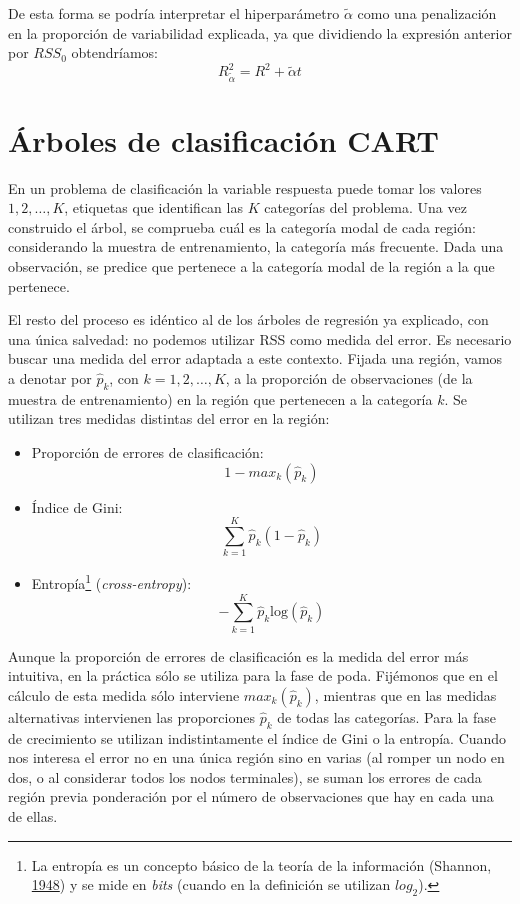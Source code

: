 \documentclass[
  spanish,
]{book}
\theoremstyle{break}
\theoremstyle{definition}
\theoremstyle{definition}
\theoremstyle{definition}
\theoremstyle{remark}
\begin{document}
De esta forma se podría interpretar el hiperparámetro \(\tilde \alpha\) como una penalización en la proporción de variabilidad explicada, ya que dividiendo la expresión anterior por \(RSS_0\) obtendríamos:
\[R^2_{\tilde \alpha}=R^2+ \tilde \alpha  t\]

\hypertarget{uxe1rboles-de-clasificaciuxf3n-cart}{%
\section{Árboles de clasificación CART}\label{uxe1rboles-de-clasificaciuxf3n-cart}}

En un problema de clasificación la variable respuesta puede tomar los valores
\(1, 2, \ldots, K\), etiquetas que identifican las \(K\) categorías del problema.
Una vez construido el árbol, se comprueba cuál es la categoría modal de cada
región: considerando la muestra de entrenamiento, la categoría más frecuente.
Dada una observación, se predice que pertenece a la categoría modal de la
región a la que pertenece.

El resto del proceso es idéntico al de los árboles de regresión ya explicado,
con una única salvedad: no podemos utilizar RSS como medida del error. Es
necesario buscar una medida del error adaptada a este contexto.
Fijada una región, vamos a denotar por
\(\widehat p_{k}\), con \(k = 1, 2, \ldots, K\), a la proporción de observaciones
(de la muestra de entrenamiento) en la región que pertenecen a la categoría \(k\).
Se utilizan tres medidas distintas del error en la región:

\begin{itemize}
\item
  Proporción de errores de clasificación:
  \[1 - max_{k} (\widehat p_{k})\]
\item
  Índice de Gini:
  \[\sum_{k=1}^K \widehat p_{k} (1 - \widehat p_{k})\]
\item
  Entropía\footnote{La entropía es un concepto básico de la teoría de la información (Shannon, \protect\hyperlink{ref-shannon1948mathematical}{1948}) y se mide en \emph{bits} (cuando en la definición se utilizan \(log_2\)).} (\emph{cross-entropy}):
  \[- \sum_{k=1}^K \widehat p_{k} \text{log}(\widehat p_{k})\]
\end{itemize}

Aunque la proporción de errores de clasificación es la medida del error más intuitiva, en la práctica sólo se utiliza para la fase de poda. Fijémonos que en el cálculo de esta medida sólo interviene \(max_{k} (\widehat p_{k})\), mientras que en las medidas alternativas intervienen las proporciones \(\widehat p_{k}\) de todas las categorías. Para la fase de crecimiento se utilizan indistintamente el índice de Gini o la entropía. Cuando nos interesa el error no en una única región sino en varias (al romper un nodo en dos, o al considerar todos los nodos terminales), se suman los errores de cada región previa ponderación por el número de observaciones que hay en cada una de ellas.
\end{document}
